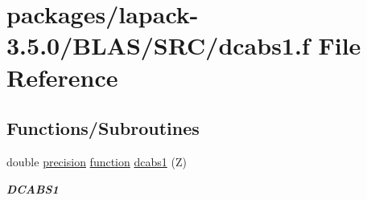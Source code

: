 \hypertarget{lapack-3_85_80_2BLAS_2SRC_2dcabs1_8f}{}\section{packages/lapack-\/3.5.0/\+B\+L\+A\+S/\+S\+R\+C/dcabs1.f File Reference}
\label{lapack-3_85_80_2BLAS_2SRC_2dcabs1_8f}
\subsection*{Functions/\+Subroutines}
\begin{DoxyCompactItemize}
\item 
double \hyperlink{numinquire_8h_a2c8e616467665d0b2814d4c1589ba74e}{precision} \hyperlink{afunc_8m_a7b5e596df91eadea6c537c0825e894a7}{function} \hyperlink{group__double__blas__level1_ga53914429b84cb315da483e71e27ed5c1}{dcabs1} (Z)
\begin{DoxyCompactList}\small\item\em {\bfseries D\+C\+A\+B\+S1} \end{DoxyCompactList}\end{DoxyCompactItemize}
